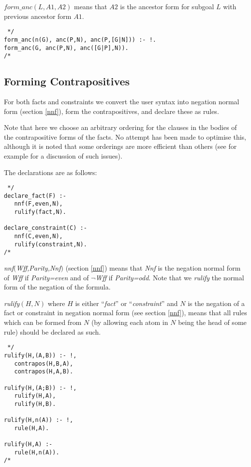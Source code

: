 $form\_anc(L,A1,A2)$ means that $A2$ is the ancestor form for
subgoal $L$ with previous ancestor form $A1$.

\begin{verbatim} */
form_anc(n(G), anc(P,N), anc(P,[G|N])) :- !.
form_anc(G, anc(P,N), anc([G|P],N)).
/* \end{verbatim}
\subsection{Forming Contrapositives}
For both facts and constraints we convert the user
syntax into negation normal
form (section \ref{nnf}), form the contrapositives,
and declare these as rules.

Note that here we choose an arbitrary ordering for the clauses
in the bodies of the contrapositive forms of the facts. No
attempt has been made to optimise this, although it is noted that some
orderings are more efficient than others (see for example \cite{smith86}
for a discussion of such issues).

The declarations are as follows:
\begin{verbatim} */
declare_fact(F) :-
   nnf(F,even,N),
   rulify(fact,N).

declare_constraint(C) :-
   nnf(C,even,N),
   rulify(constraint,N).
/* \end{verbatim}

{\em nnf\/$($Wff,Parity,Nnf\/$)$} (section \ref{nnf})
means that {\em Nnf\/} is the negation normal form
of {\em Wff} if {\em Parity=even} and of $\neg${\em Wff}
if {\em Parity=odd}. Note that we {\em rulify} the normal form
of the negation of the formula.

{\em rulify\/}$(H,N)$ where $H$ is
either ``{\em fact\/}'' or ``{\em constraint\/}''
and $N$ is the negation of a fact or constraint
in negation normal form (see section \ref{nnf}),
means that all rules which can be formed from $N$ (by allowing each
atom in $N$ being the head of some rule) should be declared as such.
\begin{verbatim} */
rulify(H,(A,B)) :- !,
   contrapos(H,B,A),
   contrapos(H,A,B).

rulify(H,(A;B)) :- !,
   rulify(H,A),
   rulify(H,B).

rulify(H,n(A)) :- !,
   rule(H,A).

rulify(H,A) :-
   rule(H,n(A)).
/* \end{verbatim}

